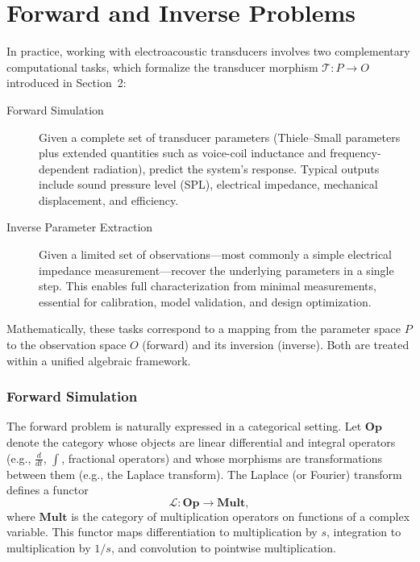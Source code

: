 \newpage
\section{Forward and Inverse Problems}

In practice, working with electroacoustic transducers involves two complementary computational tasks, which formalize the transducer morphism $\mathcal{T}: P \to O$ introduced in Section~2:

\begin{description}
    \item[Forward Simulation] Given a complete set of transducer parameters (Thiele–Small parameters plus extended quantities such as voice-coil inductance and frequency-dependent radiation), predict the system’s response. Typical outputs include sound pressure level (SPL), electrical impedance, mechanical displacement, and efficiency.

    \item[Inverse Parameter Extraction] Given a limited set of observations—most commonly a simple electrical impedance measurement—recover the underlying parameters in a single step. This enables full characterization from minimal measurements, essential for calibration, model validation, and design optimization.
\end{description}

Mathematically, these tasks correspond to a mapping from the parameter space $P$ to the observation space $O$ (forward) and its inversion (inverse). Both are treated within a unified algebraic framework.

\subsubsection{Forward Simulation}

The forward problem is naturally expressed in a categorical setting. Let $\mathbf{Op}$ denote the category whose objects are linear differential and integral operators (e.g., $\frac{d}{dt}$, $\int$, fractional operators) and whose morphisms are transformations between them (e.g., the Laplace transform). The Laplace (or Fourier) transform defines a functor 
\[
\mathcal{L}: \mathbf{Op} \longrightarrow \mathbf{Mult},
\]
where $\mathbf{Mult}$ is the category of multiplication operators on functions of a complex variable. This functor maps differentiation to multiplication by $s$, integration to multiplication by $1/s$, and convolution to pointwise multiplication.

